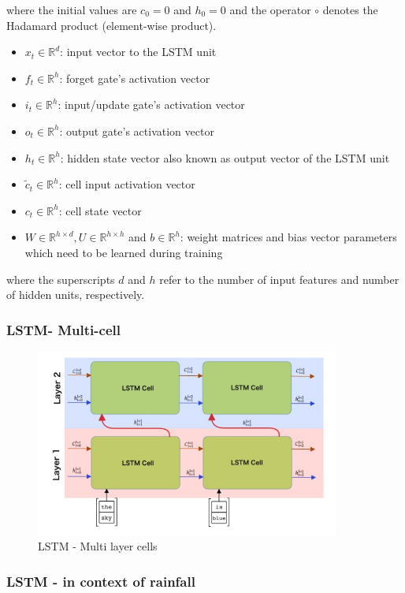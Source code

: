 \documentclass[12pt]{report}
\begin{document}
where the initial values are $c_0 = 0$ and $h_0 = 0$ and the operator $\circ$ denotes the Hadamard product (element-wise product). 

\begin{itemize}
	\item $x_t \in \mathbb{R}^{d}$: input vector to the LSTM unit 
	\item $f_t \in \mathbb{R}^{h}$: forget gate's activation vector
	\item $i_t \in \mathbb{R}^{h}$: input/update gate's activation vector 
	\item $o_t \in \mathbb{R}^{h}$: output gate's activation vector
	\item $h_t \in \mathbb{R}^{h}$: hidden state vector also known as output vector of the LSTM unit 
	\item $\tilde{c}_t \in \mathbb{R}^{h}$: cell input activation vector
	\item $c_t \in \mathbb{R}^{h}$: cell state vector
	\item $W \in \mathbb{R}^{h \times d}, U \in \mathbb{R}^{h \times h} $ and $b \in \mathbb{R}^{h}$: weight matrices and bias vector parameters which need to be learned during training
\end{itemize}

where the superscripts $d$ and $h$ refer to the number of input features and number of hidden units, respectively.


\subsubsection{LSTM- Multi-cell}

\begin{figure}[H]\centering\includegraphics[width=10cm]{LSTM_MULTI.png}\caption{LSTM - Multi layer cells}\end{figure}
\subsubsection{LSTM - in context of rainfall}
\end{document}

